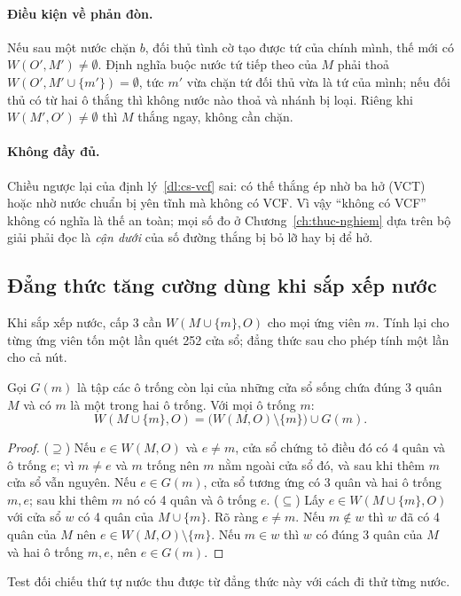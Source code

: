 \paragraph{Điều kiện về phản đòn.} Nếu sau một nước chặn $b$, đối thủ tình cờ tạo được tứ của chính mình, thế mới
có $W(O',M')\neq\emptyset$. Định nghĩa buộc nước tứ tiếp theo của $M$ phải thoả $W(O',M'\cup\{m'\})=\emptyset$,
tức $m'$ vừa chặn tứ đối thủ vừa là tứ của mình; nếu đối thủ có từ hai ô thắng thì không nước nào thoả và nhánh bị
loại. Riêng khi $W(M',O')\neq\emptyset$ thì $M$ thắng ngay, không cần chặn.

\paragraph{Không đầy đủ.} Chiều ngược lại của định lý~\ref{dl:cs-vcf} sai: có thế thắng ép nhờ ba hở (VCT) hoặc
nhờ nước chuẩn bị yên tĩnh mà không có VCF. Vì vậy ``không có VCF'' không có nghĩa là thế an toàn; mọi số đo ở
Chương~\ref{ch:thuc-nghiem} dựa trên bộ giải phải đọc là \emph{cận dưới} của số đường thắng bị bỏ lỡ hay bị để hở.

\subsection{Đẳng thức tăng cường dùng khi sắp xếp nước}
Khi sắp xếp nước, cấp 3 cần $W(M\cup\{m\},O)$ cho mọi ứng viên $m$. Tính lại cho từng ứng viên tốn một lần quét
252 cửa sổ; đẳng thức sau cho phép tính một lần cho cả nút.
\begin{dinhly}
\label{dl:cs-gain}
Gọi $G(m)$ là tập các ô trống còn lại của những cửa sổ sống chứa đúng 3 quân $M$ và có $m$ là một trong hai ô
trống. Với mọi ô trống $m$:
\begin{equation}
  W(M\cup\{m\},O)=\bigl(W(M,O)\setminus\{m\}\bigr)\cup G(m).
  \label{eq:cs-gain}
\end{equation}
\end{dinhly}
\begin{proof}
($\supseteq$) Nếu $e\in W(M,O)$ và $e\ne m$, cửa sổ chứng tỏ điều đó có 4 quân và ô trống $e$; vì $m\ne e$ và $m$
trống nên $m$ nằm ngoài cửa sổ đó, và sau khi thêm $m$ cửa sổ vẫn nguyên. Nếu $e\in G(m)$, cửa sổ tương ứng có 3
quân và hai ô trống $m,e$; sau khi thêm $m$ nó có 4 quân và ô trống $e$.
($\subseteq$) Lấy $e\in W(M\cup\{m\},O)$ với cửa sổ $w$ có 4 quân của $M\cup\{m\}$. Rõ ràng $e\ne m$. Nếu
$m\notin w$ thì $w$ đã có 4 quân của $M$ nên $e\in W(M,O)\setminus\{m\}$. Nếu $m\in w$ thì $w$ có đúng 3 quân của
$M$ và hai ô trống $m,e$, nên $e\in G(m)$.
\end{proof}
Test  đối chiếu thứ tự nước thu được từ đẳng thức này với cách đi thử từng nước.

